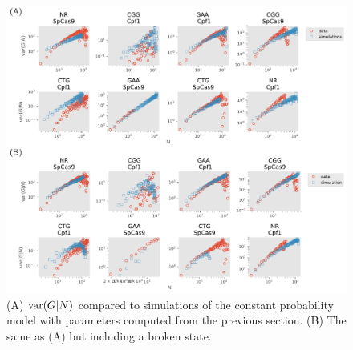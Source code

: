 \documentclass{article}
\begin{document}
\begin{figure}[t!]
\centering
\includegraphics[scale=0.7]{fig3.pdf}
\caption{(A) ${\rm var}(G|N)$ compared to simulations of the constant probability model with parameters computed from the previous section.   (B) The same as (A) but including a broken state. }\label{fig:3}
\end{figure}
\end{document}
